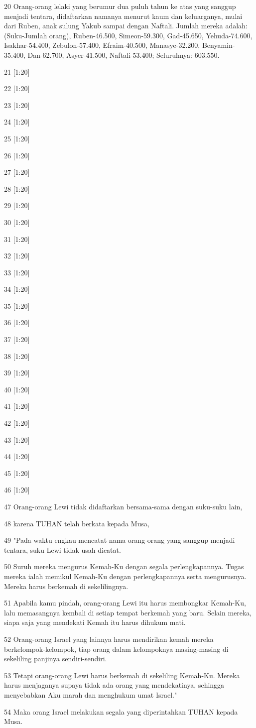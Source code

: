 \par 20 Orang-orang lelaki yang berumur dua puluh tahun ke atas yang sanggup menjadi tentara, didaftarkan namanya menurut kaum dan keluarganya, mulai dari Ruben, anak sulung Yakub sampai dengan Naftali. Jumlah mereka adalah: (Suku-Jumlah orang), Ruben-46.500, Simeon-59.300, Gad-45.650, Yehuda-74.600, Isakhar-54.400, Zebulon-57.400, Efraim-40.500, Manasye-32.200, Benyamin-35.400, Dan-62.700, Asyer-41.500, Naftali-53.400; Seluruhnya: 603.550.
\par 21 [1:20]
\par 22 [1:20]
\par 23 [1:20]
\par 24 [1:20]
\par 25 [1:20]
\par 26 [1:20]
\par 27 [1:20]
\par 28 [1:20]
\par 29 [1:20]
\par 30 [1:20]
\par 31 [1:20]
\par 32 [1:20]
\par 33 [1:20]
\par 34 [1:20]
\par 35 [1:20]
\par 36 [1:20]
\par 37 [1:20]
\par 38 [1:20]
\par 39 [1:20]
\par 40 [1:20]
\par 41 [1:20]
\par 42 [1:20]
\par 43 [1:20]
\par 44 [1:20]
\par 45 [1:20]
\par 46 [1:20]
\par 47 Orang-orang Lewi tidak didaftarkan bersama-sama dengan suku-suku lain,
\par 48 karena TUHAN telah berkata kepada Musa,
\par 49 "Pada waktu engkau mencatat nama orang-orang yang sanggup menjadi tentara, suku Lewi tidak usah dicatat.
\par 50 Suruh mereka mengurus Kemah-Ku dengan segala perlengkapannya. Tugas mereka ialah memikul Kemah-Ku dengan perlengkapannya serta mengurusnya. Mereka harus berkemah di sekelilingnya.
\par 51 Apabila kamu pindah, orang-orang Lewi itu harus membongkar Kemah-Ku, lalu memasangnya kembali di setiap tempat berkemah yang baru. Selain mereka, siapa saja yang mendekati Kemah itu harus dihukum mati.
\par 52 Orang-orang Israel yang lainnya harus mendirikan kemah mereka berkelompok-kelompok, tiap orang dalam kelompoknya masing-masing di sekeliling panjinya sendiri-sendiri.
\par 53 Tetapi orang-orang Lewi harus berkemah di sekeliling Kemah-Ku. Mereka harus menjaganya supaya tidak ada orang yang mendekatinya, sehingga menyebabkan Aku marah dan menghukum umat Israel."
\par 54 Maka orang Israel melakukan segala yang diperintahkan TUHAN kepada Musa.

